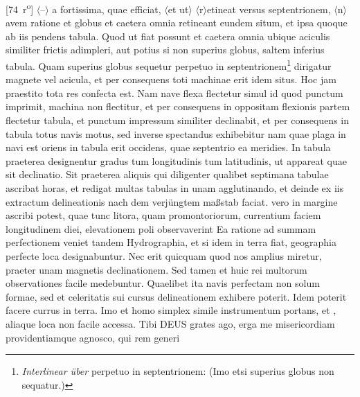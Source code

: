 [74~r\textsuperscript{o}]  $\langle$--$\rangle$ a fortissima, quae efficiat, $\langle$et ut$\rangle$ $\langle$r$\rangle$etineat versus septentrionem, $\langle$n$\rangle$avem \protect{} ratione et globus et caetera omnia retineant eundem situm, et ipsa quoque ab iis pendens tabula. Quod ut fiat possunt et caetera omnia ubique aciculis similiter frictis adimpleri, aut potius si non superius globus, saltem inferius tabula. Quam superius globus sequetur perpetuo in septentrionem\footnote{\textit{Interlinear \"{u}ber} perpetuo in septentrionem: (Imo etsi superius globus non sequatur.)} dirigatur magnete\protect{} vel acicula, et per consequens toti machinae erit idem situs. Hoc jam praestito tota res confecta est. Nam nave\protect{} flexa flectetur simul id quod punctum imprimit, machina non flectitur, et per consequens in oppositam flexionis partem flectetur tabula, et punctum impressum similiter declinabit, et per consequens in tabula totus navis\protect{} motus, sed inverse spectandus exhibebitur nam quae plaga in navi\protect{} est oriens in tabula erit occidens, quae septentrio ea meridies. In tabula praeterea designentur gradus tum longitudinis \protect{} tum latitudinis\protect{}, ut appareat quae sit declinatio\protect{}. Sit praeterea aliquis qui diligenter qualibet septimana tabulae ascribat horas, et redigat multas tabulas in unam agglutinando, et deinde ex iis extractum delineationis nach dem verj\"{u}ngtem maßstab faciat.  vero in margine ascribi potest, quae tunc litora, quam promontoriorum, currentium faciem longitudinem\protect{} diei, elevationem poli\protect{} observaverint  Ea ratione ad summam perfectionem veniet tandem Hydrographia\protect{}, et si idem in terra fiat, geographia perfecte loca designabuntur. Nec erit quicquam quod nos amplius miretur, praeter  unam magnetis\protect{} declinationem\protect{}. Sed tamen et huic rei multorum observationes facile medebuntur. Quaelibet ita navis\protect{} \pend\pstart\noindent  perfectam non solum formae, sed et celeritatis\protect{} sui cursus delineationem exhibere poterit. Idem poterit facere currus in terra. Imo et homo simplex simile instrumentum portans, et , aliaque loca non facile accessa. Tibi DEUS grates ago,  erga me misericordiam providentiamque agnosco, qui rem generi 